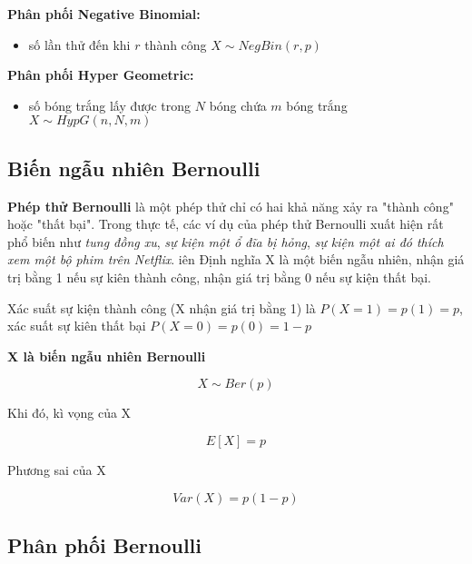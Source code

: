 \textbf{Phân phối Negative Binomial:}

\begin{itemize}
  \item số lần thử đến khi $r$ thành công $X \sim NegBin(r,p)$
\end{itemize}

\textbf{Phân phối Hyper Geometric:}

\begin{itemize}
  \item số bóng trắng lấy được trong $N$ bóng chứa $m$ bóng trắng  $X \sim HypG(n, N, m)$
\end{itemize}

\subsection{Biến ngẫu nhiên Bernoulli}

\textbf{Phép thử Bernoulli} là một phép thử chỉ có hai khả năng xảy ra "thành công" hoặc "thất bại". Trong thực tế, các ví dụ của phép thử Bernoulli xuất hiện rất phổ biến như \textit{tung đồng xu}, \textit{sự kiện một ổ đĩa bị hỏng}, \textit{sự kiện một ai đó thích xem một bộ phim trên Netflix}.
iên
Định nghĩa X là một biến ngẫu nhiên, nhận giá trị bằng 1 nếu sự kiên thành công, nhận giá trị bằng 0 nếu sự kiện thất bại.

Xác suất sự kiện thành công (X nhận giá trị bằng 1) là $P(X = 1) = p(1) = p$, xác suất sự kiên thất bại $P(X = 0) = p(0) = 1 - p$

\textbf{X là biến ngẫu nhiên Bernoulli}

$$X \sim Ber(p)$$

Khi đó, kì vọng của X

$$E[X] = p$$

Phương sai của X

$$Var(X)=p(1-p)$$

\subsection{Phân phối Bernoulli}

